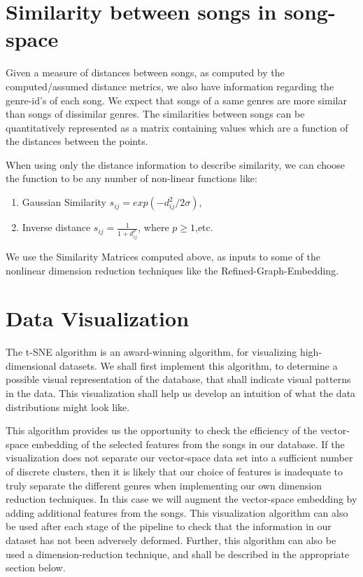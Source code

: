 \documentclass[10pt]{article}
\begin{document}
\section{Similarity between songs in song-space}
Given a measure of distances between songs, as computed by the computed/assumed distance metrics, we also have information regarding the genre-id's of each song. We expect that songs of a same genres are more similar than songs of dissimilar genres. The similarities between songs can be quantitatively represented as a matrix containing values which are a function of the distances between the points. 

When using only the distance information to describe similarity, we can choose the function to be any number of non-linear functions like:
\begin{enumerate}
\item Gaussian Similarity $s_{ij} = exp(-d_{ij}^2 / 2\sigma)$,
\item Inverse distance $s_{ij} = \frac{1}{1 + d_{ij}^p}$, where $p \geq 1$,etc.
\end{enumerate}
We use the Similarity Matrices computed above, as inputs to some of the nonlinear dimension reduction techniques like the Refined-Graph-Embedding.

\section{Data Visualization}
The t-SNE algorithm \cite{tSNEdataViz} is an award-winning algorithm, for visualizing high-dimensional datasets. We shall first implement this algorithm, to determine a possible visual representation of the database, that shall indicate visual patterns in the data. This visualization shall help us develop an intuition of what the data distributions might look like. 

This algorithm provides us the opportunity to check the efficiency of the vector-space embedding of the selected features from the songs in our database.  If the visualization does not separate our vector-space data set into a sufficient number of discrete clusters, then it is likely that our choice of features is inadequate to truly separate the different genres when implementing our own dimension reduction techniques.  In this case we will augment the vector-space embedding by adding additional features from the songs.  This visualization algorithm can also be used after each stage of the pipeline to check that the information in our dataset has not been adversely deformed. Further, this algorithm can also be used a dimension-reduction technique, and shall be described in the appropriate section below.
\end{document}
